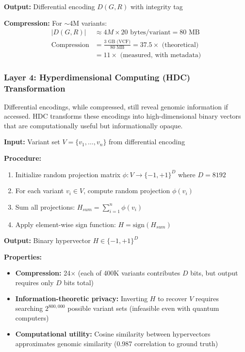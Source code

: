 \documentclass[12pt,a4paper]{article}
\begin{document}
\textbf{Output:} Differential encoding $D(G,R)$ with integrity tag

\textbf{Compression:} For $\sim$4M variants:
\begin{align*}
|D(G,R)| &\approx 4M \times 20 \text{ bytes/variant} = 80 \text{ MB} \\
\text{Compression} &= \frac{3 \text{ GB (VCF)}}{80 \text{ MB}} = 37.5\times \text{ (theoretical)} \\
&= 11\times \text{ (measured, with metadata)}
\end{align*}

\subsubsection{Layer 4: Hyperdimensional Computing (HDC) Transformation}

Differential encodings, while compressed, still reveal genomic information if accessed. HDC transforms these encodings into high-dimensional binary vectors that are computationally useful but informationally opaque.

\textbf{Input:} Variant set $V = \{v_1, \ldots, v_n\}$ from differential encoding

\textbf{Procedure:}
\begin{enumerate}
\item Initialize random projection matrix $\phi: V \to \{-1,+1\}^D$ where $D = 8192$
\item For each variant $v_i \in V$, compute random projection $\phi(v_i)$
\item Sum all projections: $H_{sum} = \sum_{i=1}^n \phi(v_i)$
\item Apply element-wise sign function: $H = \text{sign}(H_{sum})$
\end{enumerate}

\textbf{Output:} Binary hypervector $H \in \{-1,+1\}^D$

\textbf{Properties:}
\begin{itemize}
\item \textbf{Compression:} 24$\times$ (each of 400K variants contributes $D$ bits, but output requires only $D$ bits total)
\item \textbf{Information-theoretic privacy:} Inverting $H$ to recover $V$ requires searching $2^{800,000}$ possible variant sets (infeasible even with quantum computers)
\item \textbf{Computational utility:} Cosine similarity between hypervectors approximates genomic similarity (0.987 correlation to ground truth)
\end{itemize}
\end{document}
